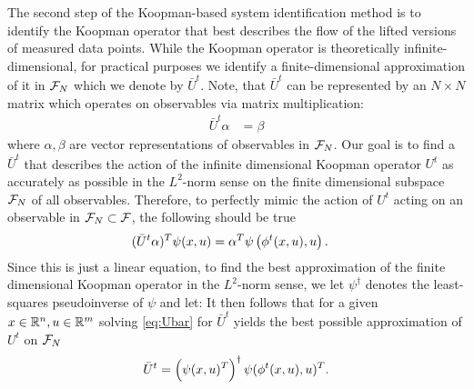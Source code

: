 The second step of the Koopman-based system identification method is to identify the Koopman operator that best describes the flow of the lifted versions of measured data points.
While the Koopman operator is theoretically infinite-dimensional, for practical purposes we identify a finite-dimensional approximation of it in $\mathcal{F}_N$ which we denote by $\bar{U}^t$.
Note, that $\bar{U}^t$ can be represented by an $N \times N$ matrix which operates on observables via matrix multiplication:
\begin{align}
    \bar{U}^t {\alpha} &= {\beta} 
    \label{eq:Ubar}
\end{align}
where $\alpha, \beta$ are vector representations of observables in $\mathcal{F}_N$.
Our goal is to find a $\bar{U}^t$ that describes the action of the infinite dimensional Koopman operator $U^t$ as accurately as possible in the $L^2$-norm sense on the finite dimensional subspace $\mathcal{F}_N$  of all observables.
Therefore, to perfectly mimic the action of $U^t$ acting on an observable in $\mathcal{F}_N \subset \mathcal{F}$, the following should be true
\begin{align}
    ( \bar{U}^t {\alpha} )^T {\psi}(x, u) &=
    {\alpha}^T {\psi} \left( \phi^t(x,u), u \right).
    \label{eq:Ubar}
\end{align}
Since this is just a linear equation, to find the best approximation of the finite dimensional Koopman operator in the $L^2$-norm sense, we let  ${\psi}^\dagger$ denotes the least-squares pseudoinverse of ${\psi}$ and let:
It then follows that for a given ${x \in \mathbb{R}^n, u \in \mathbb{R}^m}$ solving \eqref{eq:Ubar} for $\bar{U}^t$ yields the best possible approximation of $U^t$ on $\mathcal{F}_N$
\begin{align}
    \bar{U}^t = \left( {\psi}(x, u)^T \right)^\dagger {\psi}( \phi^t(x,u), u )^T.
    \label{eq:Uapprox}
\end{align}


